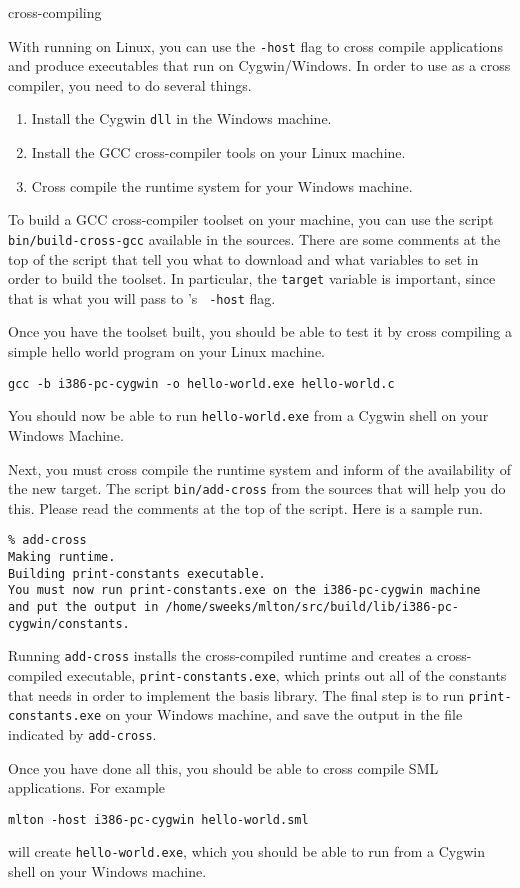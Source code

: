       {cross-compiling}

With {\mlton} running on Linux, you can use the {\tt -host} flag to cross
compile applications and produce executables that run on Cygwin/Windows.
In order to use {\mlton} as a
cross compiler, you need to do several things.

\begin{enumerate}

\item Install the Cygwin {\tt dll} in the Windows machine.

\item Install the GCC cross-compiler tools on your Linux machine.

\item Cross compile the {\mlton} runtime system for your Windows machine.

\end{enumerate}

To build a GCC cross-compiler toolset on your machine, you can use the script
{\tt bin/build-cross-gcc} available in the {\mlton} sources.  There are some
comments at the top of the script that tell you what to download and what
variables to set in order to build the toolset.  In particular, the {\tt target}
variable is important, since that is what you will pass to {\mlton}'s {\tt
-host} flag.

Once you have the toolset built, you should be able to test it by cross
compiling a simple hello world program on your Linux machine.
\begin{verbatim}
gcc -b i386-pc-cygwin -o hello-world.exe hello-world.c
\end{verbatim}
You should now be able to run {\tt hello-world.exe} from a Cygwin shell on your
Windows Machine.

Next, you must cross compile the {\mlton} runtime system and inform {\mlton} of
the availability of the new target.  The script {\tt bin/add-cross} from
the {\mlton} sources that will help you do this.  Please read the comments at
the top of the script.  Here is a sample run.
\begin{verbatim}
% add-cross
Making runtime.
Building print-constants executable.
You must now run print-constants.exe on the i386-pc-cygwin machine
and put the output in /home/sweeks/mlton/src/build/lib/i386-pc-cygwin/constants.
\end{verbatim}
Running {\tt add-cross} installs the cross-compiled runtime and creates a
cross-compiled executable, {\tt print-constants.exe}, which prints out all of
the constants that {\mlton} needs in order to implement the basis library.  The
final step is to run {\tt print-constants.exe} on your Windows machine, and save
the output in the file indicated by {\tt add-cross}.

Once you have done all this, you should be able to cross compile SML
applications.  For example
\begin{verbatim}
mlton -host i386-pc-cygwin hello-world.sml
\end{verbatim}
will create {\tt hello-world.exe}, which you should be able to run from a Cygwin
shell on your Windows machine.
